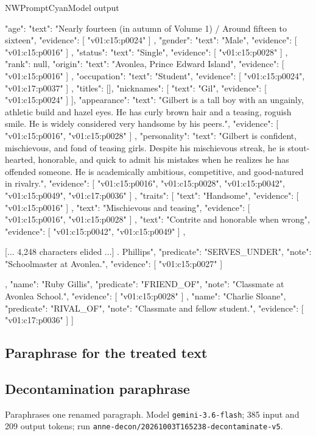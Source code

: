 \begin{nwprompt}{NWPromptCyan}{Model output}
{
  "age": {
    "text": "Nearly fourteen (in autumn of Volume 1) / Around fifteen to sixteen",
    "evidence": [
      "v01:c15:p0024"
    ]
  },
  "gender": {
    "text": "Male",
    "evidence": [
      "v01:c15:p0016"
    ]
  },
  "status": {
    "text": "Single",
    "evidence": [
      "v01:c15:p0028"
    ]
  },
  "rank": null,
  "origin": {
    "text": "Avonlea, Prince Edward Island",
    "evidence": [
      "v01:c15:p0016"
    ]
  },
  "occupation": {
    "text": "Student",
    "evidence": [
      "v01:c15:p0024",
      "v01:c17:p0037"
    ]
  },
  "titles": [],
  "nicknames": [
    {
      "text": "Gil",
      "evidence": [
        "v01:c15:p0024"
      ]
    }
  ],
  "appearance": {
    "text": "Gilbert is a tall boy with an ungainly, athletic build and hazel eyes. He has curly brown hair and a teasing, roguish smile. He is widely considered very handsome by his peers.",
    "evidence": [
      "v01:c15:p0016",
      "v01:c15:p0028"
    ]
  },
  "personality": {
    "text": "Gilbert is confident, mischievous, and fond of teasing girls. Despite his mischievous streak, he is stout-hearted, honorable, and quick to admit his mistakes when he realizes he has offended someone. He is academically ambitious, competitive, and good-natured in rivalry.",
    "evidence": [
      "v01:c15:p0016",
      "v01:c15:p0028",
      "v01:c15:p0042",
      "v01:c15:p0049",
      "v01:c17:p0036"
    ]
  },
  "traits": [
    {
      "text": "Handsome",
      "evidence": [
        "v01:c15:p0016"
      ]
    },
    {
      "text": "Mischievous and teasing",
      "evidence": [
        "v01:c15:p0016",
        "v01:c15:p0028"
      ]
    },
    {
      "text": "Contrite and honorable when wrong",
      "evidence": [
        "v01:c15:p0042",
        "v01:c15:p0049"
      ]
    },
    {
 
[... 4,248 characters elided ...]
. Phillips",
      "predicate": "SERVES_UNDER",
      "note": "Schoolmaster at Avonlea.",
      "evidence": [
        "v01:c15:p0027"
      ]
    },
    {
      "name": "Ruby Gillis",
      "predicate": "FRIEND_OF",
      "note": "Classmate at Avonlea School.",
      "evidence": [
        "v01:c15:p0028"
      ]
    },
    {
      "name": "Charlie Sloane",
      "predicate": "RIVAL_OF",
      "note": "Classmate and fellow student.",
      "evidence": [
        "v01:c17:p0036"
      ]
    }
  ]
}
\end{nwprompt}

\ifdefined\nwvtwo\subsection*{Paraphrase for the treated text}\else\subsection*{Decontamination paraphrase}\fi
Paraphrases one renamed paragraph. Model \texttt{gemini-3.6-flash}; 385 input and 209 output tokens; run \nolinkurl{anne-decon/20261003T165238-decontaminate-v5}.

